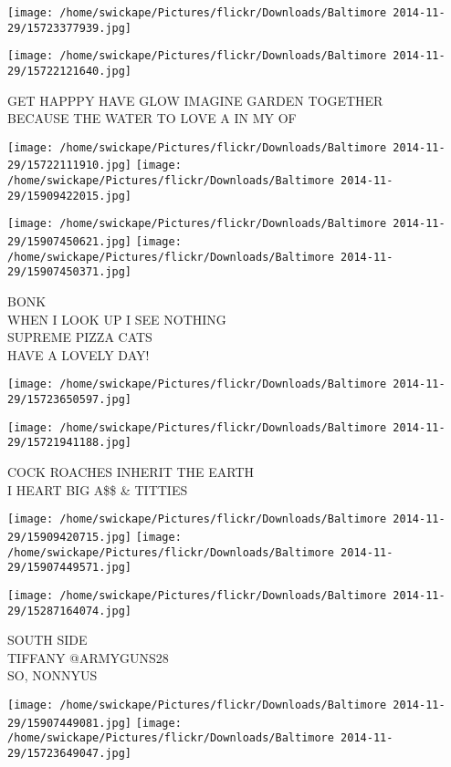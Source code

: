 \documentclass[10pt,letterpaper]{article}
\begin{document}
\texttt{[image: /home/swickape/Pictures/flickr/Downloads/Baltimore 2014-11-29/15723377939.jpg]}

\vspace{0.25in}
\texttt{[image: /home/swickape/Pictures/flickr/Downloads/Baltimore 2014-11-29/15722121640.jpg]}

GET HAPPPY HAVE GLOW IMAGINE GARDEN TOGETHER\\
BECAUSE THE WATER TO LOVE A IN MY OF
\pagebreak

\texttt{[image: /home/swickape/Pictures/flickr/Downloads/Baltimore 2014-11-29/15722111910.jpg]}
\texttt{[image: /home/swickape/Pictures/flickr/Downloads/Baltimore 2014-11-29/15909422015.jpg]}

\texttt{[image: /home/swickape/Pictures/flickr/Downloads/Baltimore 2014-11-29/15907450621.jpg]}
\texttt{[image: /home/swickape/Pictures/flickr/Downloads/Baltimore 2014-11-29/15907450371.jpg]}

BONK\\
WHEN I LOOK UP I SEE NOTHING\\
SUPREME PIZZA CATS\\
HAVE A LOVELY DAY!
\pagebreak

\texttt{[image: /home/swickape/Pictures/flickr/Downloads/Baltimore 2014-11-29/15723650597.jpg]}

\vspace{0.25in}
\texttt{[image: /home/swickape/Pictures/flickr/Downloads/Baltimore 2014-11-29/15721941188.jpg]}

COCK ROACHES INHERIT THE EARTH\\
I HEART BIG A\$\$ \& TITTIES
\pagebreak

\texttt{[image: /home/swickape/Pictures/flickr/Downloads/Baltimore 2014-11-29/15909420715.jpg]}
\texttt{[image: /home/swickape/Pictures/flickr/Downloads/Baltimore 2014-11-29/15907449571.jpg]}

\vspace{0.25in}
\texttt{[image: /home/swickape/Pictures/flickr/Downloads/Baltimore 2014-11-29/15287164074.jpg]}

SOUTH SIDE\\
TIFFANY @ARMYGUNS28\\
SO, NONNYUS
\pagebreak

\texttt{[image: /home/swickape/Pictures/flickr/Downloads/Baltimore 2014-11-29/15907449081.jpg]}
\texttt{[image: /home/swickape/Pictures/flickr/Downloads/Baltimore 2014-11-29/15723649047.jpg]}
\end{document}
